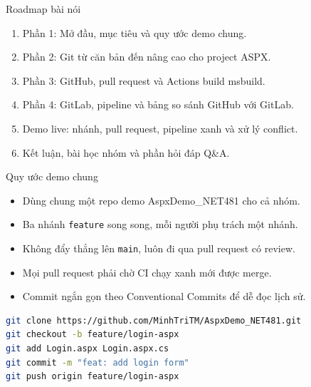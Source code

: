 \begin{frame}{Roadmap bài nói}
\begin{enumerate}
\item Phần 1: Mở đầu, mục tiêu và quy ước demo chung.
\item Phần 2: Git từ căn bản đến nâng cao cho project ASPX.
\item Phần 3: GitHub, pull request và Actions build msbuild.
\item Phần 4: GitLab, pipeline và bảng so sánh GitHub với GitLab.
\item Demo live: nhánh, pull request, pipeline xanh và xử lý conflict.
\item Kết luận, bài học nhóm và phần hỏi đáp Q\&A.
\end{enumerate}
\end{frame}

\begin{frame}[fragile]{Quy ước demo chung}
\begin{itemize}
\item Dùng chung một repo demo AspxDemo\_NET481 cho cả nhóm.
\item Ba nhánh \texttt{feature} song song, mỗi người phụ trách một nhánh.
\item Không đẩy thẳng lên \texttt{main}, luôn đi qua pull request có review.
\item Mọi pull request phải chờ CI chạy xanh mới được merge.
\item Commit ngắn gọn theo Conventional Commits để dễ đọc lịch sử.
\end{itemize}
\begin{lstlisting}[language=bash]
git clone https://github.com/MinhTriTM/AspxDemo_NET481.git
git checkout -b feature/login-aspx
git add Login.aspx Login.aspx.cs
git commit -m "feat: add login form"
git push origin feature/login-aspx
\end{lstlisting}
\end{frame}